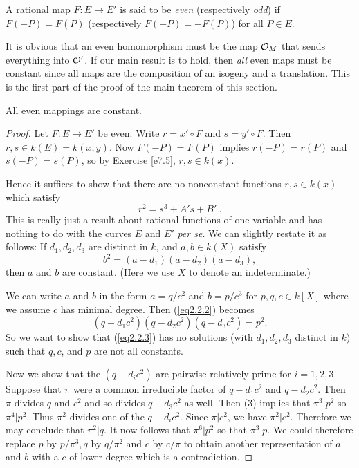 \begin{defi}
\label{d2.2.6}
A rational map $F:E\rightarrow E'$ is said to be {\it even} (respectively {\it odd}) if $F(-P)=F(P)$ (respectively $F(-P)=-F(P)$) for all $P\in E$.
\end{defi}

It is obvious that an even homomorphism must be the map $\mathcal{O}_{M}$ that sends everything into $\mathcal{O}'$. If our main result is to hold, then {\it all} even maps must be constant since all maps are the composition of an isogeny and a translation. This is the first part of the proof of the main theorem of this section.

\begin{theo}
\label{t2.2.1}
All even mappings are constant.
\end{theo}

\begin{proof}
Let $F:E\rightarrow E'$ be even. Write $r=x'\circ F$ and $s=y'\circ F$. Then $r, s\in k(E)=k(x, y)$. Now $F(-P)=F(P)$ implies $r(-P)=r(P)$ and $s(-P)=s(P)$, so by Exercise \ref{e7.5}, $r,s\in k(x)$.

Hence it suffices to show that there are no nonconstant functions $r,s\in k(x)$ which satisfy
$$
r^{2}=s^{3}+A's+B'\ .
$$
This is really just a result about rational functions of one variable and has nothing to do with the curves $E$ and $E'$ {\it per se}. We can slightly restate it as follows: If $d_{1},d_{2},d_{3}$ are distinct in $k$, and $a,b\in k(X)$ satisfy
\begin{equation}
\label{eq2.2.2}
b^{2}=(a-d_{1})(a-d_{2})(a-d_{3}),
\end{equation}
then $a$ and $b$ are constant. (Here we use $X$ to denote an indeterminate.)

We can write $a$ and $b$ in the form $a=q/c^{2}$ and $b=p/c^{3}$ for $p,q,c\in k[X]$ where we assume $c$ has minimal degree. Then (\ref{eq2.2.2}) becomes
\begin{equation}
\label{eq2.2.3}
(q-d_{1}c^{2})(q-d_{2}c^{2})(q-d_{3}c^{2})=p^{2} .
\end{equation}
So we want to show that (\ref{eq2.2.3}) has no solutions (with $d_{1},d_{2},d_{3}$ distinct in $k$) such that $q,c$, and $p$ are not all constants.

Now we show that the $(q-d_{i}c^{2})$ are pairwise relatively prime for $i=1,2,3$. Suppose that $\pi$ were a common irreducible factor of $q-d_{1}c^{2}$ and $q-d_{2}c^{2}$. Then $\pi$ divides $q$ and $c^{2}$ and so divides $q-d_{3}c^{2}$ as well. Then (3) implies that $\pi^{3}|p^{2}$ so $\pi^{4}|p^{2}$. Thus $\pi^{2}$ divides one of the $q-d_{i}c^{2}$. Since $\pi|c^{2}$, we have $\pi^{2}|c^{2}$. Therefore we may conclude that $\pi^{2}|q$. It now follows that $\pi^{6}|p^{2}$ so that $\pi^{3}|p$. We could therefore replace $p$ by $p/\pi^{3},q$ by $q/\pi^{2}$ and $c$ by $ c/\pi$ to obtain another representation of $a$ and $b$ with a $c$ of lower degree which is a contradiction.


\end{proof}
